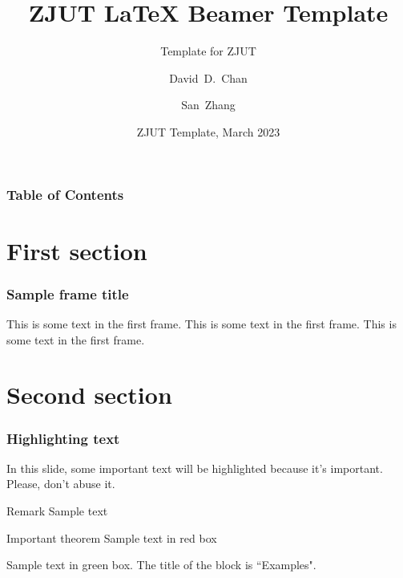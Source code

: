 \documentclass{beamer}
\title[About Beamer]
{ZJUT {\LaTeX} Beamer Template}
\subtitle{Template for ZJUT}
\author[Smith, Yamada] %
{David~D.~Chan\inst{1} \and San~Zhang\inst{2}}
\institute[ZJUT] %
{
  \inst{1}%
  College of Computer Science and Technology\\
  Zhejiang University of Technology
  \and
  \inst{2}%
  College of Chemical Engineering\\
  Zhejiang University of Technology
}
\date[ZJUT 2023] %
{ZJUT Template, March 2023}
\begin{document}
\frame{\titlepage}

\begin{frame}
\frametitle{Table of Contents}
\tableofcontents
\end{frame}

\section{First section}

\begin{frame}
\frametitle{Sample frame title}
This is some text in the first frame. This is some text in the first frame. This is some text in the first frame.
\end{frame}

\section{Second section}

\begin{frame}
\frametitle{Highlighting text}

In this slide, some important text will be
\alert{highlighted} because it's important.
Please, don't abuse it.

\begin{block}{Remark}
Sample text
\end{block}

\begin{alertblock}{Important theorem}
Sample text in red box
\end{alertblock}

\begin{examples}
Sample text in green box. The title of the block is ``Examples".
\end{examples}
\end{frame}
\end{document}
